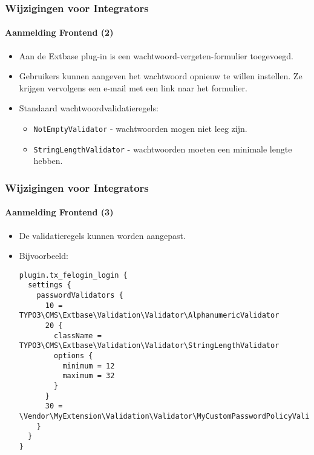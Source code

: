 
\begin{frame}[fragile]
	\frametitle{Wijzigingen voor Integrators}
	\framesubtitle{Aanmelding Frontend (2)}

	\begin{itemize}

		\item Aan de Extbase plug-in is een wachtwoord-vergeten-formulier toegevoegd.
		\item Gebruikers kunnen aangeven het wachtwoord opnieuw te willen instellen. Ze krijgen vervolgens een e-mail met een link naar het formulier.
		\item Standaard wachtwoordvalidatieregels:

			\begin{itemize}
				\item \texttt{NotEmptyValidator} - wachtwoorden mogen niet leeg zijn.
				\item \texttt{StringLengthValidator} - wachtwoorden moeten een minimale lengte hebben.
			\end{itemize}

	\end{itemize}

\end{frame}


\begin{frame}[fragile]
	\frametitle{Wijzigingen voor Integrators}
	\framesubtitle{Aanmelding Frontend (3)}

	\lstset{basicstyle=\tiny\ttfamily}

	\begin{itemize}
		\item De validatieregels kunnen worden aangepast.
		\item Bijvoorbeeld:
\begin{lstlisting}
plugin.tx_felogin_login {
  settings {
    passwordValidators {
      10 = TYPO3\CMS\Extbase\Validation\Validator\AlphanumericValidator
      20 {
        className = TYPO3\CMS\Extbase\Validation\Validator\StringLengthValidator
        options {
          minimum = 12
          maximum = 32
        }
      }
      30 = \Vendor\MyExtension\Validation\Validator\MyCustomPasswordPolicyValidator
    }
  }
}
\end{lstlisting}

	\end{itemize}

\end{frame}

